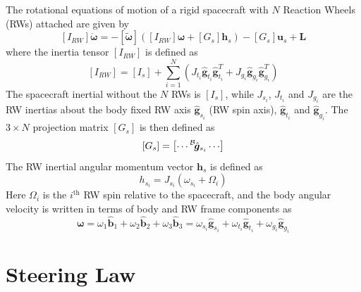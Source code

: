 \documentclass[]{BasiliskReportMemo}
\begin{document}
The rotational equations of motion of a rigid spacecraft with $N$ Reaction Wheels (RWs) attached are given by\cite{schaub}
\begin{equation}
	\label{eq:MS:2}
	[I_{RW}] \dot{\bm \omega} = - [\tilde{\bm \omega}] \left( 
	[I_{RW}] \bm\omega + [G_{s}] \bm h_{s} 
	\right) - [G_{s}] \bm u_{s} + \bm L
\end{equation}
where  the inertia tensor $[I_{RW}]$ is defined as
\begin{equation}
	\label{eq:MS:3}
	[I_{RW}] = [I_{s}] + \sum_{i=1}^{N} \left (J_{t_{i}} \hat{\bm g}_{t_{i}} \hat{\bm g}_{t_{i}}^{T} + J_{g_{i}} \hat{\bm g}_{g_{i}} \hat{\bm g}_{g_{i}}^{T}
	\right)
\end{equation}
The spacecraft inertial without the $N$ RWs is $[I_{s}]$, while $J_{s_{i}}$, $J_{t_{i}}$ and $J_{g_{i}}$ are the RW inertias about the body fixed RW axis $\hat{\bm g}_{s_{i}}$ (RW spin axis), $\hat{\bm g}_{t_{i}}$ and $\hat{\bm g}_{g_{i}}$.  The $3\times N$ projection matrix $[G_{s}]$ is then defined as
\begin{equation}
	\label{eq:MS:4}
	[G_{s}] = \begin{bmatrix}
		\cdots \leftexp{B}{\hat{\bm g}}_{s_{i}} \cdots
	\end{bmatrix}
\end{equation}
The RW inertial angular momentum vector $\bm h_{s}$ is defined as
\begin{equation}
	\label{eq:MS:5}
	h_{s_{i}} = J_{s_{i}} (\omega_{s_{i}} + \Omega_{i})
\end{equation}
Here $\Omega_{i}$ is the $i^{\text{th}}$ RW spin relative to the spacecraft, and the body angular velocity is written in terms of body and RW frame components as
\begin{equation}
	\label{eq:MS:6}
	\bm\omega = \omega_{1} \hat{\bm b}_{1} + \omega_{2} \hat{\bm b}_{2} + \omega_{3} \hat{\bm b}_{3}
	= \omega_{s_{i}} \hat{\bm g}_{s_{i}} +  \omega_{t_{i}} \hat{\bm g}_{t_{i}} +  \omega_{g_{i}} \hat{\bm g}_{g_{i}}
\end{equation}









\section{Steering Law}
\end{document}
